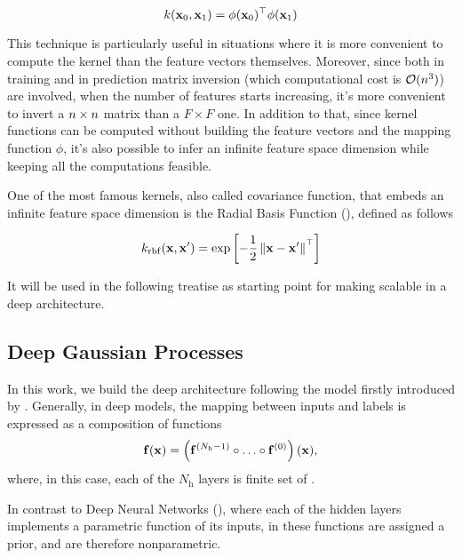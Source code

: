 \begin{equation}
    k(\mathbf{x}_0, \mathbf{x}_1) = \phi(\mathbf{x}_0)^\top\phi(\mathbf{x}_1)
\end{equation}

This technique is particularly useful in situations where it is more convenient to compute the kernel than the feature vectors themselves. Moreover, since both in training and in prediction matrix inversion (which computational cost is $\mathcal{O}(n^3)$) are involved, when the number of features starts increasing, it's more convenient to invert a $n\times n$ matrix than a $F\times F$ one. In addition to that, since kernel functions can be computed without building the feature vectors and the mapping function $\phi$, it's also possible to infer an infinite feature space dimension while keeping all the computations feasible.

One of the most famous kernels, also called covariance function, that embeds an infinite feature space dimension is the Radial Basis Function (\rbf), defined as follows

\begin{equation} \label{eq:covariance:rbf:ard}
k_{\mathrm{rbf}}(\mathbf{x}, \mathbf{x}^{\prime}) =
\exp\left[-\frac{1}{2} \left\| \mathbf{x} - \mathbf{x}^{\prime} \right\|^{\top}  \right]
\end{equation}

It will be used in the following treatise as starting point for making  scalable in a deep architecture.

\subsection{Deep Gaussian Processes}


%
In this work, we build the deep architecture following the model firstly introduced by \citet{Filippone2017}. Generally, in deep models, the mapping between inputs and labels is expressed as a composition of functions
\begin{equation}
\mathbf{f}(\mathbf{x}) = \left(\mathbf{f}^{(N_{\mathrm{h}} - 1)} \circ \ldots \circ \mathbf{f}^{(0)}\right)(\mathbf{x}),
\end{equation}
where, in this case, each of the $N_{\mathrm{h}}$ layers is finite set of .

In contrast to Deep Neural Networks (), where each of the hidden layers implements a parametric function of its inputs, in  these functions are assigned a \gp prior, and are therefore nonparametric.

